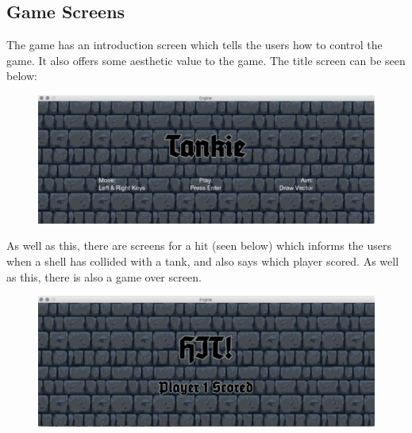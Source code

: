 \documentclass[12pt]{article}
\begin{document}
\subsection{Game Screens}
The game has an introduction screen which tells the users how to control the game. It also offers some aesthetic value to the game. The title screen can be seen below:

\begin{figure}[H]
\centerline{\includegraphics[width=17cm]{main}}
\end{figure}

As well as this, there are screens for a hit (seen below) which informs the users when a shell has collided with a tank, and also says which player scored. As well as this, there is also a game over screen.

\begin{figure}[H]
\centerline{\includegraphics[width=17cm]{hit}}
\end{figure}
\end{document}
